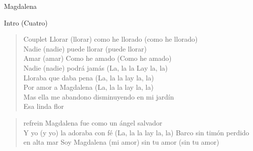 \begin{song}{Magdalena}

\begin{instrumental}{Intro (Cuatro)}
   
\end{instrumental}


\begin{verse}{Couplet}
	Llorar (llorar) como he llorado (como he llorado)\\
	Nadie (nadie) puede llorar (puede llorar)\\
	Amar (amar) Como he amado (Como he amado)\\
	Nadie (nadie) podrá jamás (La, la la Lay la, la) \\
	Lloraba que daba pena (La, la la lay la, la)\\
	Por amor a Magdalena (La, la la lay la, la)\\
	Mas ella me abandono disminuyendo en mi jardín\\
	Esa linda flor\hspace{4ex}\ 
\end{verse}


\begin{verse}{refrein}
	\hspace{8ex}Magdalena fue como un ángel salvador\\
	Y \chord{A7}yo (y yo) la adoraba con \chord{Dm}fé (La, la la lay la, \chord{D7}la)
	\chord{C}Barco sin timón perdido en \chord{F}alta mar
	Soy Magdalena (mi amor) sin tu amor (sin tu amor)
\end{verse}

\end{song}
